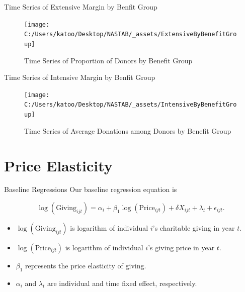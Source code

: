 \documentclass[
  ignorenonframetext,
]{beamer}
\providecommand{\tightlist}{%
  \setlength{\itemsep}{0pt}\setlength{\parskip}{0pt}}
\begin{document}
\begin{frame}{Time Series of Extensive Margin by Benfit Group}
\protect\hypertarget{time-series-of-extensive-margin-by-benfit-group}{}
\begin{figure}
\texttt{[image: C:/Users/katoo/Desktop/NASTAB/\_assets/ExtensiveByBenefitGroup]} \caption{Time Series of Proportion of Donors by Benefit Group}\label{fig:unnamed-chunk-4}
\end{figure}
\end{frame}

\begin{frame}{Time Series of Intensive Margin by Benfit Group}
\protect\hypertarget{time-series-of-intensive-margin-by-benfit-group}{}
\begin{figure}
\texttt{[image: C:/Users/katoo/Desktop/NASTAB/\_assets/IntensiveByBenefitGroup]} \caption{Time Series of Average Donations among Donors by Benefit Group}\label{fig:unnamed-chunk-5}
\end{figure}
\end{frame}

\hypertarget{price-elasticity}{%
\section{Price Elasticity}\label{price-elasticity}}

\begin{frame}{Baseline Regressions}
\protect\hypertarget{baseline-regressions}{}
Our baseline regression equation is

\[
    \log(\text{Giving}_{ijt}) = 
    \alpha_i + \beta_1 \log(\text{Price}_{ijt}) + \delta X_{ijt} + \lambda_t + \epsilon_{ijt}.
\]

\begin{itemize}
\tightlist
\item
  \(\log(\text{Giving}_{ijt})\) is logarithm of individual \(i\)'s charitable giving in year \(t\).
\item
  \(\log(\text{Price}_{ijt})\) is logarithm of individual \(i\)'s giving price in year \(t\).
\item
  \(\beta_1\) represents the price elasticity of giving.
\item
  \(\alpha_i\) and \(\lambda_t\) are individual and time fixed effect, respectively.
\end{itemize}
\end{frame}
\end{document}
